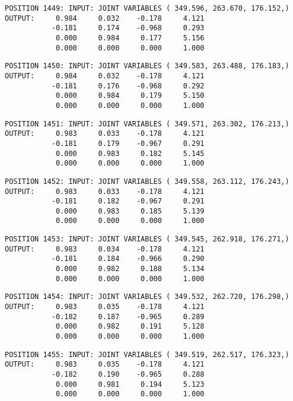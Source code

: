 \begin{verbatim}
POSITION 1449: INPUT: JOINT VARIABLES ( 349.596, 263.670, 176.152,)
OUTPUT:     0.984     0.032    -0.178     4.121
           -0.181     0.174    -0.968     0.293
            0.000     0.984     0.177     5.156
            0.000     0.000     0.000     1.000
\end{verbatim} \pagebreak[1]\begin{verbatim}
POSITION 1450: INPUT: JOINT VARIABLES ( 349.583, 263.488, 176.183,)
OUTPUT:     0.984     0.032    -0.178     4.121
           -0.181     0.176    -0.968     0.292
            0.000     0.984     0.179     5.150
            0.000     0.000     0.000     1.000
\end{verbatim} \pagebreak[1]\begin{verbatim}
POSITION 1451: INPUT: JOINT VARIABLES ( 349.571, 263.302, 176.213,)
OUTPUT:     0.983     0.033    -0.178     4.121
           -0.181     0.179    -0.967     0.291
            0.000     0.983     0.182     5.145
            0.000     0.000     0.000     1.000
\end{verbatim} \pagebreak[1]\begin{verbatim}
POSITION 1452: INPUT: JOINT VARIABLES ( 349.558, 263.112, 176.243,)
OUTPUT:     0.983     0.033    -0.178     4.121
           -0.181     0.182    -0.967     0.291
            0.000     0.983     0.185     5.139
            0.000     0.000     0.000     1.000
\end{verbatim} \pagebreak[1]\begin{verbatim}
POSITION 1453: INPUT: JOINT VARIABLES ( 349.545, 262.918, 176.271,)
OUTPUT:     0.983     0.034    -0.178     4.121
           -0.181     0.184    -0.966     0.290
            0.000     0.982     0.188     5.134
            0.000     0.000     0.000     1.000
\end{verbatim} \pagebreak[1]\begin{verbatim}
POSITION 1454: INPUT: JOINT VARIABLES ( 349.532, 262.720, 176.298,)
OUTPUT:     0.983     0.035    -0.178     4.121
           -0.182     0.187    -0.965     0.289
            0.000     0.982     0.191     5.128
            0.000     0.000     0.000     1.000
\end{verbatim} \pagebreak[1]\begin{verbatim}
POSITION 1455: INPUT: JOINT VARIABLES ( 349.519, 262.517, 176.323,)
OUTPUT:     0.983     0.035    -0.178     4.121
           -0.182     0.190    -0.965     0.288
            0.000     0.981     0.194     5.123
            0.000     0.000     0.000     1.000
\end{verbatim} \pagebreak[1]\begin{verbatim}

\end{verbatim}
